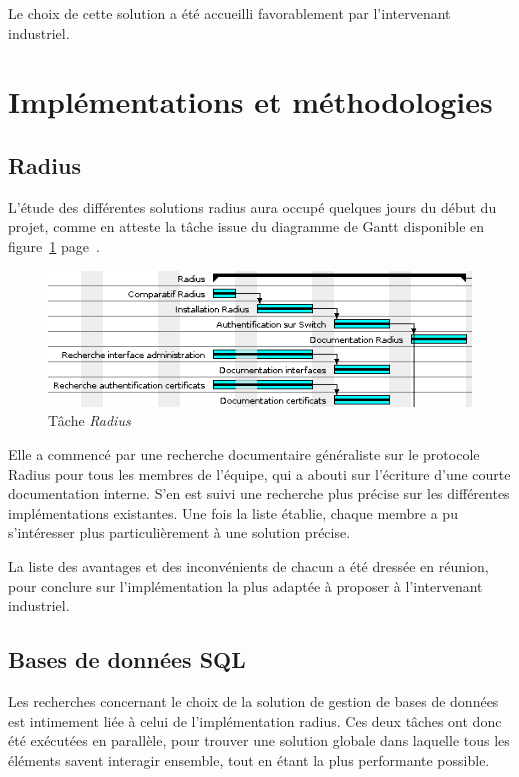 Le choix de cette solution a été accueilli favorablement par l'intervenant industriel.

\section{Implémentations et méthodologies}
\subsection{Radius}

L'étude des différentes solutions radius aura occupé quelques jours du début du projet, comme en atteste la tâche issue du diagramme de Gantt disponible en figure~\ref{gantt_radius} page~\pageref{gantt_radius}.

\begin{figure}[!h]
	\begin{center}
		\includegraphics[width=350pt]{img/gantt_radius.png}
	\end{center}
	\caption{Tâche \textit{Radius}}
	\label{gantt_radius}
\end{figure}

Elle a commencé par une recherche documentaire généraliste sur le protocole Radius pour tous les membres de l'équipe, qui a abouti sur l'écriture d'une courte documentation interne. S'en est suivi une recherche plus précise sur les différentes implémentations existantes. Une fois la liste établie, chaque membre a pu s'intéresser plus particulièrement à une solution précise.

La liste des avantages et des inconvénients de chacun a été dressée en réunion, pour conclure sur l'implémentation la plus adaptée à proposer à l'intervenant industriel.

\subsection{Bases de données SQL}

Les recherches concernant le choix de la solution de gestion de bases de données est intimement liée à celui de l'implémentation radius. Ces deux tâches ont donc été exécutées en parallèle, pour trouver une solution globale dans laquelle tous les éléments savent interagir ensemble, tout en étant la plus performante possible.

